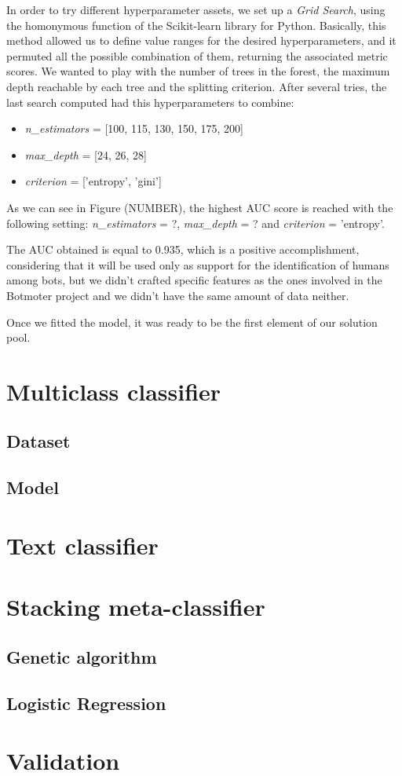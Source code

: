 In order to try different hyperparameter assets, we set up a \textit{Grid Search}, using the homonymous function of the Scikit-learn library for Python.
Basically, this method allowed us to define value ranges for the desired hyperparameters, and it permuted all the possible combination of them, returning the associated metric scores.
We wanted to play with the number of trees in the forest, the maximum depth reachable by each tree and the splitting criterion. After several tries, the last search computed had this hyperparameters to combine:
\begin{itemize}
	\item[\PencilRight] \textit{n\_estimators} = [100, 115, 130, 150, 175, 200]
	\item[\PencilRight]\textit{max\_depth} = [24, 26, 28]
	\item[\PencilRight]\textit{criterion} = ['entropy', 'gini']
\end{itemize}
As we can see in Figure (NUMBER), the highest AUC score is reached with the following setting:\textit{ n\_estimators} = ?, \textit{max\_depth} = ? and \textit{criterion} = 'entropy'.

The AUC obtained is equal to 0.935, which is a positive accomplishment, considering that it will be used only as support for the identification of humans among bots, but we didn't crafted specific features as the ones involved in the Botmoter project and we didn't have the same amount of data neither.

Once we fitted the model, it was ready to be the first element of our solution pool.

\section{Multiclass classifier}
\subsection{Dataset}
\subsection{Model}

\section{Text classifier}
\section{Stacking meta-classifier}
\subsection{Genetic algorithm}
\subsection{Logistic Regression}
\section{Validation}